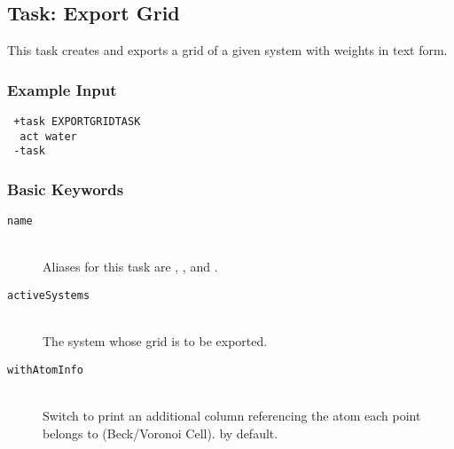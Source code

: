 \subsection{Task: Export Grid}\label{sec:tasks:ExportGridTask}
This task creates and exports a grid of a given system with weights in text form.
\subsubsection{Example Input}
\begin{lstlisting}
 +task EXPORTGRIDTASK
  act water
 -task
\end{lstlisting}

\subsubsection{Basic Keywords}
\begin{description}
\item [\texttt{name}]\hfill \\
  Aliases for this task are , , and .
\item [\texttt{activeSystems}]\hfill \\
  The system whose grid is to be exported.
\item [\texttt{withAtomInfo}]\hfill \\
  Switch to print an additional column referencing the
atom each point belongs to (Beck/Voronoi Cell).  by default.
\end{description}
